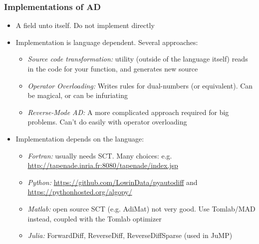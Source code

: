 \documentclass[nofootline]{etk-presentation}
\begin{document}
\begin{frame}[fragile]	\frametitle{Implementations of AD}
	\begin{itemize}
		\item A field unto itself.  Do not implement directly
		\item Implementation is language dependent.  Several approaches:
		\begin{itemize}
			\item \textit{Source code transformation:} utility (outside of the language itself) reads in the code for your function, and generates new source
			\item \textit{Operator Overloading:} Writes rules for dual-numbers (or equivalent).  Can be magical, or can be infuriating
			\item \textit{Reverse-Mode AD:} A more complicated approach required for big problems.  Can't do easily with operator overloading
		\end{itemize}
		\item Implementation depends on the language:
		\begin{itemize}
			\item \textit{Fortran:} usually needs SCT.  Many choices: e.g. \url{http://tapenade.inria.fr:8080/tapenade/index.jsp}
			\item \textit{Python:} \url{https://github.com/LowinData/pyautodiff} and \url{https://pythonhosted.org/algopy/}
			\item \textit{Matlab:} open source SCT (e.g. AdiMat) not very good.  Use Tomlab/MAD instead, coupled with the Tomlab optimizer
			\item \textit{Julia:} ForwardDiff, ReverseDiff, ReverseDiffSparse (used in JuMP)
		\end{itemize}
	\end{itemize}
\end{frame}

	\begin{frame}\frametitle{}
	\bigskip
	\bigskip
	\bigskip	
	\begin{center}
		{\huge {}}
	\end{center}
\end{frame}
\end{document}
